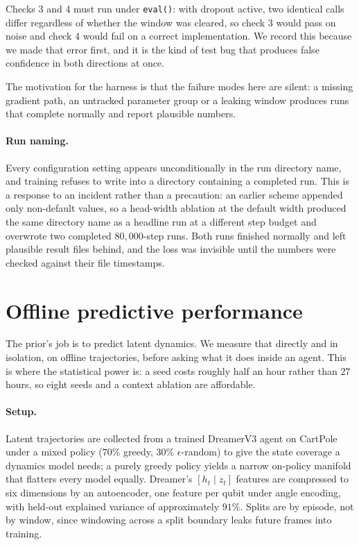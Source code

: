 \documentclass[11pt]{article}
\newif\ifdraft
\newcommand{\pend}[1]{%
  \ifdraft\textcolor{PendFG}{\textbf{[TODO:} \textit{#1}\textbf{]}}\fi}
\begin{document}
Checks 3 and 4 must run under \texttt{eval()}: with dropout active, two
identical calls differ regardless of whether the window was cleared, so
check 3 would pass on noise and check 4 would fail on a correct
implementation. We record this because we made that error first, and it
is the kind of test bug that produces false confidence in both
directions at once.

The motivation for the harness is that the failure modes here are
silent: a missing gradient path, an untracked parameter group or a
leaking window produces runs that complete normally and report
plausible numbers.

\paragraph{Run naming.} Every configuration setting appears
unconditionally in the run directory name, and training refuses to write
into a directory containing a completed run. This is a response to an
incident rather than a precaution: an earlier scheme appended only
non-default values, so a head-width ablation at the default width
produced the same directory name as a headline run at a different step
budget and overwrote two completed $80{,}000$-step runs. Both runs
finished normally and left plausible result files behind, and the loss
was invisible until the numbers were checked against their file
timestamps.
\pend{note in Section~\ref{sec:closedloop} which full-observation seeds
are from the re-run}

\section{Offline predictive performance}\label{sec:offline}
The prior's job is to predict latent dynamics. We measure that directly
and in isolation, on offline trajectories, before asking what it does
inside an agent. This is where the statistical power is: a seed costs
roughly half an hour rather than $27$ hours, so eight seeds and a
context ablation are affordable.

\paragraph{Setup.} Latent trajectories are collected from a trained
DreamerV3 agent on CartPole under a mixed policy ($70\%$ greedy,
$30\%$ $\epsilon$-random) to give the state coverage a dynamics model
needs; a purely greedy policy yields a narrow on-policy manifold that
flatters every model equally. Dreamer's $[h_t \mid z_t]$ features are
compressed to six dimensions by an autoencoder, one feature per qubit
under angle encoding, with held-out explained variance of approximately
$91\%$. Splits are by episode, not by window, since windowing across a
split boundary leaks future frames into training.
\end{document}
